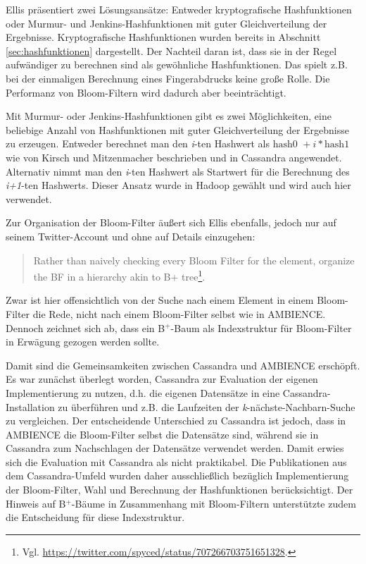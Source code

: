 Ellis präsentiert zwei Lösungsansätze: Entweder kryptografische Hashfunktionen oder Murmur- und Jenkins-Hashfunktionen mit guter Gleichverteilung der Ergebnisse. Kryptografische Hashfunktionen wurden bereits in Abschnitt \ref{sec:hashfunktionen} dargestellt. Der Nachteil daran ist, dass sie in der Regel aufwändiger zu berechnen sind als gewöhnliche Hashfunktionen. Das spielt z.B. bei der einmaligen Berechnung eines Fingerabdrucks keine große Rolle. Die Performanz von Bloom-Filtern wird dadurch aber beeinträchtigt. 

Mit Murmur- oder Jenkins-Hashfunktionen gibt es zwei Möglichkeiten, eine beliebige Anzahl von Hashfunktionen mit guter Gleichverteilung der Ergebnisse zu erzeugen. Entweder berechnet man den \textit{i}-ten Hashwert als $\text{hash0 }+ i\ast \text{hash1}$ wie von Kirsch und Mitzenmacher beschrieben und in Cassandra angewendet. Alternativ nimmt man den \textit{i}-ten Hashwert als Startwert für die Berechnung des \textit{i+1}-ten Hashwerts. Dieser Ansatz wurde in Hadoop gewählt und wird auch hier verwendet. 

Zur Organisation der Bloom-Filter äußert sich Ellis ebenfalls, jedoch nur auf seinem Twitter-Account und ohne auf Details einzugehen: 
\begin{quote}
Rather than naively checking every Bloom Filter for the element, organize the BF in a hierarchy akin to B+ tree\footnote{Vgl. \url{https://twitter.com/spyced/status/707266703751651328}.}.
\end{quote}
Zwar ist hier offensichtlich von der Suche nach einem Element in einem Bloom-Filter die Rede, nicht nach einem Bloom-Filter selbst wie in AMBIENCE. Dennoch zeichnet sich ab, dass ein B$^+$-Baum als Indexstruktur für Bloom-Filter in Erwägung gezogen werden sollte. 

Damit sind die Gemeinsamkeiten zwischen Cassandra und AMBIENCE erschöpft. Es war zunächst überlegt worden, Cassandra zur Evaluation der eigenen Implementierung zu nutzen, d.h. die eigenen Datensätze in eine Cassandra-Installation zu überführen und z.B. die Laufzeiten der \textit{k}-nächste-Nachbarn-Suche zu vergleichen. Der entscheidende Unterschied zu Cassandra ist jedoch, dass in AMBIENCE die Bloom-Filter selbst die Datensätze sind, während sie in Cassandra zum Nachschlagen der Datensätze verwendet werden. Damit erwies sich die Evaluation mit Cassandra als nicht praktikabel. Die Publikationen aus dem Cassandra-Umfeld wurden daher ausschließlich bezüglich Implementierung der Bloom-Filter, Wahl und Berechnung der Hashfunktionen berücksichtigt. Der Hinweis auf B$^+$-Bäume in Zusammenhang mit Bloom-Filtern unterstützte zudem die Entscheidung für diese Indexstruktur. 

